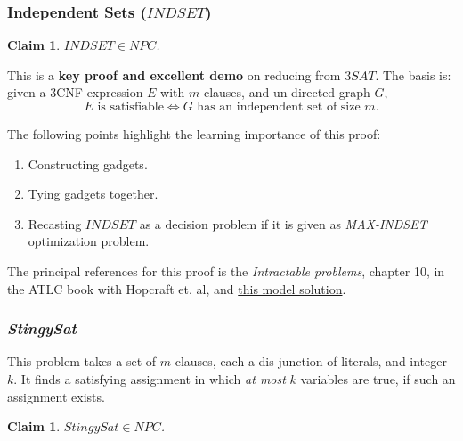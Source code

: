 \documentclass{article}
\newtheorem{claim}[theorem]{Claim}
\theoremstyle{definition}
\begin{document}
\subsubsection{Independent Sets ($INDSET$)}
\begin{claim}
	$INDSET \in NPC$.
\end{claim}

This is a \textbf{key proof and excellent demo} on reducing from $3SAT$. The basis is: given a 3CNF expression $E$ with $m$ clauses, and un-directed graph $G$,
$$E \text{ is satisfiable} \iff G \text{ has an independent set of size } m.$$

The following points highlight the learning importance of this proof:

\begin{enumerate}
	\item Constructing gadgets.
	\item Tying gadgets together.
	\item Recasting $INDSET$ as a decision problem if it is given as \textit{MAX-INDSET} optimization problem. 
\end{enumerate}

The principal references for this proof is the \textit{Intractable problems}, chapter 10, in the ATLC book with Hopcraft et. al, and \href{https://www.dropbox.com/s/bsnowkygvxjos2s/gadgets-IndSet.pdf?dl=0}{this model solution}.

\subsubsection{\textit{StingySat} }
This problem takes a set of $m$ clauses, each a dis-junction of literals, and integer $k$. It finds a satisfying assignment in which \textit{at most} $k$ variables are true, if such an assignment exists.

\begin{claim}
	$StingySat \in NPC$.
\end{claim}
\end{document}
